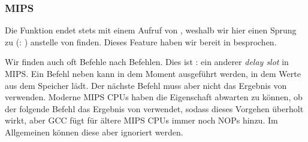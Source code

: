 \subsubsection{MIPS}



Die Funktion endet stets mit einem Aufruf von \puts, weshalb wir hier einen Sprung zu \puts (: ) anstelle von  finden.
Dieses Feature haben wir bereit in  besprochen.

Wir finden auch oft  Befehle nach  Befehlen.
Dies ist : ein anderer \emph{delay slot} in MIPS.
Ein Befehl neben  kann in dem Moment ausgeführt werden, in dem  Werte aus dem Speicher lädt.
Der nächste Befehl muss aber nicht das Ergebnis von  verwenden.
Moderne MIPS CPUs haben die Eigenschaft abwarten zu können, ob der folgende Befehl das Ergebnis von  verwendet,
sodass dieses Vorgehen überholt wirkt, aber GCC fügt für ältere MIPS CPUs immer noch NOPs hinzu.
Im Allgemeinen können diese aber ignoriert werden.